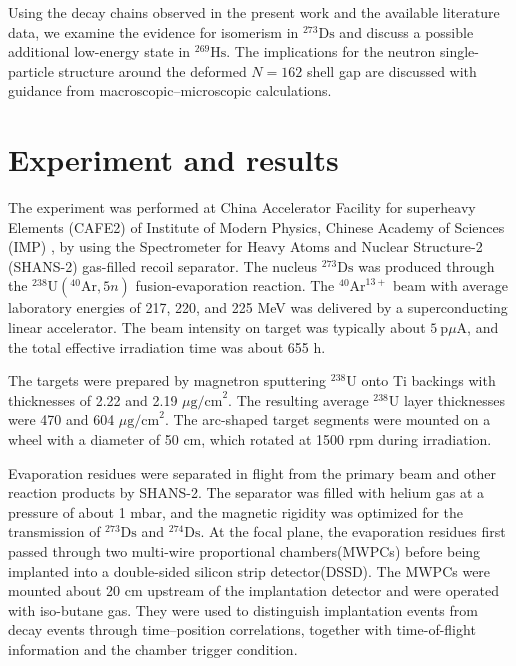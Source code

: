 \documentclass[aps,prc,reprint,superscriptaddress,floatfix]{revtex4-2}
\begin{document}
Using the decay chains observed in the present work and the available literature data, we examine the evidence for isomerism in $^{273}\mathrm{Ds}$ and discuss a possible additional low-energy state in $^{269}\mathrm{Hs}$. The implications for the neutron single-particle structure around the deformed $N = 162$ shell gap are discussed with guidance from macroscopic--microscopic calculations.

\section{Experiment and results}

The experiment was performed at China Accelerator Facility for superheavy Elements (CAFE2)\cite{sheng2021IonopticalDesignMultiparticle} of Institute of Modern Physics, Chinese Academy of Sciences (IMP) , by using the Spectrometer for Heavy Atoms and Nuclear Structure-2 (SHANS-2) gas-filled recoil separator\cite{xu2023GasfilledRecoilSeparator}. The nucleus $^{273}\mathrm{Ds}$ was produced through the $^{238}\mathrm{U}(^{40}\mathrm{Ar}, 5n)$ fusion-evaporation reaction. The $^{40}\mathrm{Ar}^{13+}$ beam with average laboratory energies of 217, 220, and 225 MeV was delivered by a superconducting linear accelerator. The beam intensity on target was typically about $5\ \mathrm{p}\mu\mathrm{A}$, and the total effective irradiation time was about 655 h.%

The targets were prepared by magnetron sputtering $^{238}\mathrm{U}$ onto Ti backings with thicknesses of 2.22 and 2.19 $\mu\mathrm{g/cm}^{2}$. The resulting average $^{238}\mathrm{U}$ layer thicknesses were 470 and 604 $\mu\mathrm{g/cm}^{2}$. The arc-shaped target segments were mounted on a wheel with a diameter of 50 cm, which rotated at 1500 rpm during irradiation.%

Evaporation residues were separated in flight from the primary beam and other reaction products by SHANS-2. The separator was filled with helium gas at a pressure of about 1 mbar, and the magnetic rigidity was optimized for the transmission of $^{273}\mathrm{Ds}$ and $^{274}\mathrm{Ds}$. At the focal plane, the evaporation residues first passed through two multi-wire proportional chambers(MWPCs) before being implanted into a double-sided silicon strip detector(DSSD). The MWPCs were mounted about 20 cm upstream of the implantation detector and were operated with iso-butane gas. They were used to distinguish implantation events from decay events through time--position correlations, together with time-of-flight information and the chamber trigger condition.
\end{document}

